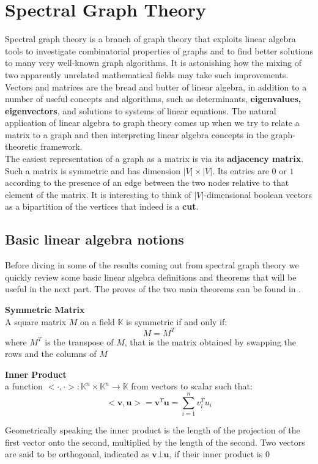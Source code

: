 
\section{Spectral Graph Theory}
Spectral graph theory is a branch of graph theory that exploits linear algebra tools to investigate combinatorial properties of graphs and to find better solutions to many very well-known graph algorithms. It is astonishing how the mixing of two apparently unrelated mathematical fields may take such improvements. \\
Vectors and matrices are the bread and butter of linear algebra, in addition to a number of useful concepts and algorithms, such as determinants, \textbf{eigenvalues, eigenvectors}, and solutions to systems of linear equations.
The natural application of linear algebra to graph theory comes up when we try to relate a matrix to a graph and then interpreting linear algebra concepts in the graph-theoretic framework.\\
The easiest representation of a graph as a matrix is via its \textbf{adjacency matrix}. Such a matrix is symmetric and has dimension $ |V| \times |V| $. Its entries are $ 0 $ or $ 1 $ according to the presence of an edge between the two nodes relative to that element of the matrix.
It is interesting to think of $ |V| $-dimensional boolean vectors as a bipartition of the vertices that indeed is a \textbf{cut}.  

\subsection{Basic linear algebra notions}
Before diving in some of the results coming out from spectral graph theory we quickly review some basic linear algebra definitions and theorems that will be useful in the next part.
The proves of the two main theorems can be found in \cite{trevi-notes}.

\begin{definition}{\textbf{Symmetric Matrix}} \\
	A square matrix $ M $ on a field $ \mathbb{K} $ is symmetric if and only if:
	\[ M = M^T \]
	where $ M^T $ is the transpose of $ M $, that is the matrix obtained by swapping the rows and the columns of $ M $
\end{definition}

\begin{definition}{\textbf{Inner Product}} \\
a function $ <\cdot,\cdot> : \mathbb{K}^n \times \mathbb{K}^n \longrightarrow \mathbb{K}$ from vectors to scalar such that:
\[ <\mathbf{v},\mathbf{u}> = \mathbf{v}^T\mathbf{u} = \sum_{i=1}^{n}v_{i}^{T}u_i \]
\end{definition}
Geometrically speaking the inner product is the length of the projection of the first vector onto the second, multiplied by the length of the second.
Two vectors are said to be orthogonal, indicated as $ \mathbf{v} \bot \mathbf{u} $, if their inner product is 0


